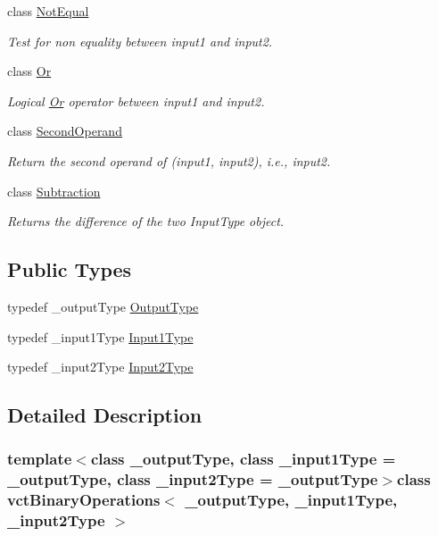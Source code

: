 \begin{DoxyCompactItemize}
class \hyperlink{classvct_binary_operations_1_1_not_equal}{Not\+Equal}
\begin{DoxyCompactList}\small\item\em Test for non equality between input1 and input2. \end{DoxyCompactList}\item 
class \hyperlink{classvct_binary_operations_1_1_or}{Or}
\begin{DoxyCompactList}\small\item\em Logical \hyperlink{classvct_binary_operations_1_1_or}{Or} operator between input1 and input2. \end{DoxyCompactList}\item 
class \hyperlink{classvct_binary_operations_1_1_second_operand}{Second\+Operand}
\begin{DoxyCompactList}\small\item\em Return the second operand of (input1, input2), i.\+e., input2. \end{DoxyCompactList}\item 
class \hyperlink{classvct_binary_operations_1_1_subtraction}{Subtraction}
\begin{DoxyCompactList}\small\item\em Returns the difference of the two Input\+Type object. \end{DoxyCompactList}\end{DoxyCompactItemize}
\subsection*{Public Types}
\begin{DoxyCompactItemize}
\item 
typedef \+\_\+output\+Type \hyperlink{classvct_binary_operations_afbfa2d453460e6ab5b67c26e2d3fc4b1}{Output\+Type}
\item 
typedef \+\_\+input1\+Type \hyperlink{classvct_binary_operations_a5e56a66a012d6a28c539a08a0021c45e}{Input1\+Type}
\item 
typedef \+\_\+input2\+Type \hyperlink{classvct_binary_operations_a929119af557a04a16b4d854981e49e1b}{Input2\+Type}
\end{DoxyCompactItemize}


\subsection{Detailed Description}
\subsubsection*{template$<$class \+\_\+output\+Type, class \+\_\+input1\+Type = \+\_\+output\+Type, class \+\_\+input2\+Type = \+\_\+output\+Type$>$class vct\+Binary\+Operations$<$ \+\_\+output\+Type, \+\_\+input1\+Type, \+\_\+input2\+Type $>$}

